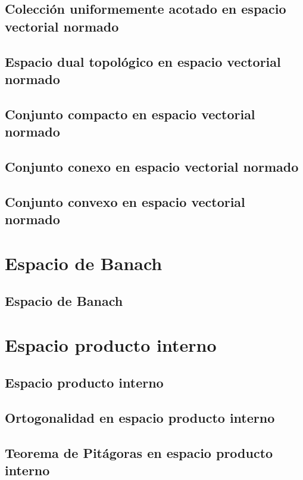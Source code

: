 \section{Colección uniformemente acotado en espacio vectorial normado}

\section{Espacio dual topológico en espacio vectorial normado}

\section{Conjunto compacto en espacio vectorial normado}

\section{Conjunto conexo en espacio vectorial normado}

\section{Conjunto convexo en espacio vectorial normado}

\chapter{Espacio de Banach}

\section{Espacio de Banach}

\chapter{Espacio producto interno}

\section{Espacio producto interno}

\section{Ortogonalidad en espacio producto interno}

\section{Teorema de Pitágoras en espacio producto interno}

